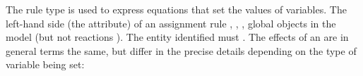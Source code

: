 \subsubsection{}
\label{sec:assignmentrule}

The rule type \AssignmentRule is used to express equations that
set the values of variables.  The left-hand side (the 
 attribute) of an assignment rule 
\Species, \SpeciesReference, \Compartment, 
 global \Parameter objects in
the model (but not reactions ).  The entity identified must
.  The effects of
an \AssignmentRule are in general terms the same, but differ in
the precise details depending on the type of variable being set:

